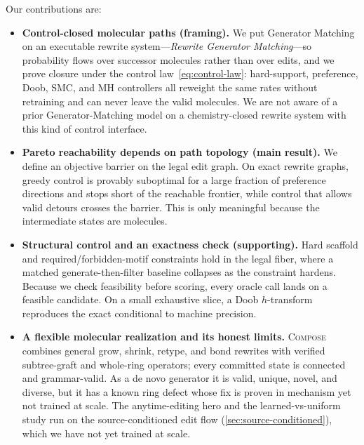 \documentclass{article}
\newcommand{\method}{\textsc{Compose}\xspace}
\theoremstyle{definition}
\theoremstyle{remark}
\begin{document}
Our contributions are:
\begin{itemize}[leftmargin=*]
    \item \textbf{Control-closed molecular paths (framing).} We put Generator Matching on an executable rewrite system---\emph{Rewrite Generator Matching}---so probability flows over successor molecules rather than over edits, and we prove closure under the control law~\eqref{eq:control-law}: hard-support, preference, Doob, SMC, and MH controllers all reweight the same rates without retraining and can never leave the valid molecules. We are not aware of a prior Generator-Matching model on a chemistry-closed rewrite system with this kind of control interface.
    \item \textbf{Pareto reachability depends on path topology (main result).} We define an objective barrier on the legal edit graph. On exact rewrite graphs, greedy control is provably suboptimal for a large fraction of preference directions and stops short of the reachable frontier, while control that allows valid detours crosses the barrier. This is only meaningful because the intermediate states are molecules.
    \item \textbf{Structural control and an exactness check (supporting).} Hard scaffold and required/forbidden-motif constraints hold in the legal fiber, where a matched generate-then-filter baseline collapses as the constraint hardens. Because we check feasibility before scoring, every oracle call lands on a feasible candidate. On a small exhaustive slice, a Doob $h$-transform reproduces the exact conditional to machine precision.
    \item \textbf{A flexible molecular realization and its honest limits.} \method combines general grow, shrink, retype, and bond rewrites with verified subtree-graft and whole-ring operators; every committed state is connected and grammar-valid. As a de novo generator it is valid, unique, novel, and diverse, but it has a known ring defect whose fix is proven in mechanism yet not trained at scale. The anytime-editing hero and the learned-vs-uniform study run on the source-conditioned edit flow (\cref{sec:source-conditioned}), which we have not yet trained at scale.
\end{itemize}
\end{document}

